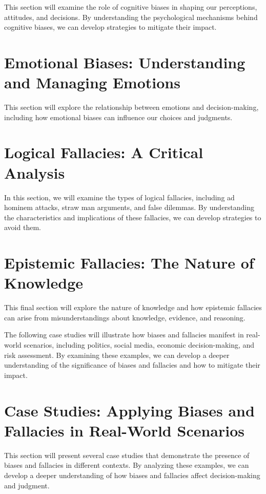 \documentclass{report}%
\begin{document}
{{{{{{{{{{{This section will examine the role of cognitive biases in shaping our perceptions, attitudes, and decisions. By understanding the psychological mechanisms behind cognitive biases, we can develop strategies to mitigate their impact.

\section{Emotional Biases: Understanding and Managing Emotions}

This section will explore the relationship between emotions and decision-making, including how emotional biases can influence our choices and judgments.

\section{Logical Fallacies: A Critical Analysis}

In this section, we will examine the types of logical fallacies, including ad hominem attacks, straw man arguments, and false dilemmas. By understanding the characteristics and implications of these fallacies, we can develop strategies to avoid them.

\section{Epistemic Fallacies: The Nature of Knowledge}

This final section will explore the nature of knowledge and how epistemic fallacies can arise from misunderstandings about knowledge, evidence, and reasoning.

The following case studies will illustrate how biases and fallacies manifest in real-world scenarios, including politics, social media, economic decision-making, and risk assessment. By examining these examples, we can develop a deeper understanding of the significance of biases and fallacies and how to mitigate their impact.

\section{Case Studies: Applying Biases and Fallacies in Real-World Scenarios}

This section will present several case studies that demonstrate the presence of biases and fallacies in different contexts. By analyzing these examples, we can develop a deeper understanding of how biases and fallacies affect decision-making and judgment.

}}}}}}}}}}}
\end{document}
